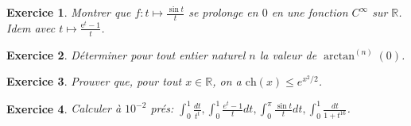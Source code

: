 \documentclass[17pt,a4paper,landscape]{article}
\newcommand{\R}{\mathbb{R}}
\newcommand{\E}{\mathrm{e}}
\theoremstyle{break}
\theoremstyle{break}
\newtheorem{Exo}{Exercice}
\begin{document}
%	
%		
%			
%			
%		
%		
	
\begin{Exo}
		 Montrer que $f:t\mapsto \frac{\sin t }{t}$ se prolonge en $0$ en une fonction $C^{\infty}$ sur $\R$. Idem avec $t\mapsto \frac{\E^t-1}{t}$.
\end{Exo}

\begin{Exo}
	 Déterminer pour tout entier naturel $n$ la valeur de $\arctan^{(n)}(0)$.
\end{Exo}

\begin{Exo}
	 Prouver que, pour tout $x\in\mathbb R$, on a $\textrm{ch}(x)\leqslant e^{x^2/2}$.
\end{Exo}


\begin{Exo}
	 Calculer \`{a} $10^{-2}$ prés: $\int_0^1\frac{dt}{t^t},\int_{0}^{1}\frac{e^{t}-1}{t}	dt,\int_{0}^{\pi }\frac{\sin t}{t}dt,\int_{0}^{1}\frac{dt}{1+t^{16}}$.
\end{Exo}
\end{document}
